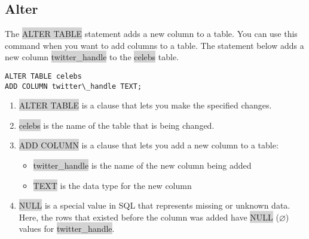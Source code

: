 \documentclass[11pt]{article}
\begin{document}
\subsection{Alter}
The \colorbox{lightgray}{ALTER TABLE} statement adds a new column to a table. You can use this command when you want to add columns to a table. The statement below adds a new column \colorbox{lightgray}{twitter\_handle} to the \colorbox{lightgray}{celebs} table.
\begin{lstlisting}
ALTER TABLE celebs 
ADD COLUMN twitter\_handle TEXT;
\end{lstlisting}
\begin{enumerate}[leftmargin = *]
\item \colorbox{lightgray}{ALTER TABLE} is a clause that lets you make the specified changes.
\item \colorbox{lightgray}{celebs} is the name of the table that is being changed.
\item \colorbox{lightgray}{ADD COLUMN} is a clause that lets you add a new column to a table:
\begin{itemize}
\item \colorbox{lightgray}{twitter\_handle} is the name of the new column being added
\item \colorbox{lightgray}{TEXT} is the data type for the new column
\end{itemize}
\item \colorbox{lightgray}{NULL} is a special value in SQL that represents missing or unknown data. Here, the rows that existed before the column was added have \colorbox{lightgray}{NULL} ($\varnothing$) values for \colorbox{lightgray}{twitter\_handle}.
\end{enumerate}
\end{document}
